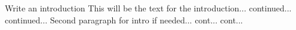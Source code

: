 
\begin{DoxyRefList}
\item[\label{todo__todo000001}%
\hypertarget{todo__todo000001}{}%
page \hyperlink{index}{Main Page} ]Write an introduction This will be the text for the introduction... continued... continued... Second paragraph for intro if needed... cont... cont...
\end{DoxyRefList}